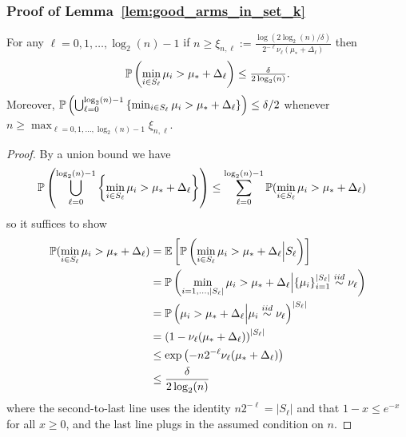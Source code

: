 \subsubsection{Proof of Lemma~\ref{lem:good_arms_in_set_k}}\label{sec:good_arms_in_set_k_proof}
\begin{lemma}
For any $\ell=0,1,\dots,\log_2(n)-1$ if  $n \geq \xi_{n,\ell} := \frac{\log(2 \log_2(n)/\delta)}{2^{-\ell} \nu_\ell(\mu_* + \Delta_\ell)}$ then 
\begin{align*}
\P\left(\min_{i \in S_\ell} \mu_i > \mu_* + \Delta_\ell \right) \leq \tfrac{\delta}{2 \log_2(n)}.
\end{align*}
Moreover, $\P\left( \bigcup_{\ell=0}^{\log_2(n)-1} \left\{ \min_{i \in S_\ell} \mu_i > \mu_* + \Delta_\ell \right\} \right)\leq\delta/2$ whenever $n \geq \max_{\ell=0,1,\dots,\log_2(n)-1} \xi_{n,\ell}$.
\end{lemma}
\begin{proof}
By a union bound we have
\begin{align*}
\P\left( \bigcup_{\ell=0}^{\log_2(n)-1} \left\{ \min_{i \in S_\ell} \mu_i > \mu_* + \Delta_\ell \right\} \right) 
&\leq  \sum_{\ell=0}^{\log_2(n)-1} \P(\min_{i \in S_\ell} \mu_i > \mu_* + \Delta_\ell)
\end{align*}
so it suffices to show
\begin{align*}
\P(\min_{i \in S_\ell} \mu_i > \mu_* + \Delta_\ell) &=
\E\left[ \P\left( \min_{i \in S_\ell} \mu_i > \mu_* + \Delta_\ell \Big| S_\ell \right) \right] \\
&=  \P\left( \min_{i =1,\dots, |S_\ell|} \mu_i > \mu_* + \Delta_\ell \Big| \{\mu_i \}_{i=1}^{|S_\ell|} \overset{iid}{\sim} \nu_\ell \right)  \\
&=  \P\left( \mu_i > \mu_* + \Delta_\ell \Big| \mu_i \overset{iid}{\sim} \nu_\ell \right)^{|S_\ell|} \\
&=  \left( 1- \nu_\ell( \mu_* + \Delta_\ell) \right)^{|S_\ell|}  \\
&\leq  \exp\left( - n 2^{-\ell}\nu_\ell( \mu_* + \Delta_\ell) \right) \\
&\leq  \frac{\delta}{2\log_2(n)}
\end{align*}
where the second-to-last line uses the identity $n 2^{-\ell} = |S_\ell|$ and that $1-x \leq e^{-x}$ for all $x\geq0$, and the last line plugs in the assumed condition on $n$.
\end{proof}

